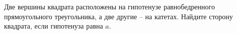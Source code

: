 \begin{ex}
	\begin{condition}
		Две вершины квадрата расположены на гипотенузе	равнобедренного прямоугольного треугольника, а две другие –	на катетах. Найдите сторону квадрата, если гипотенуза равна \( a \).
	\end{condition}
\end{ex}